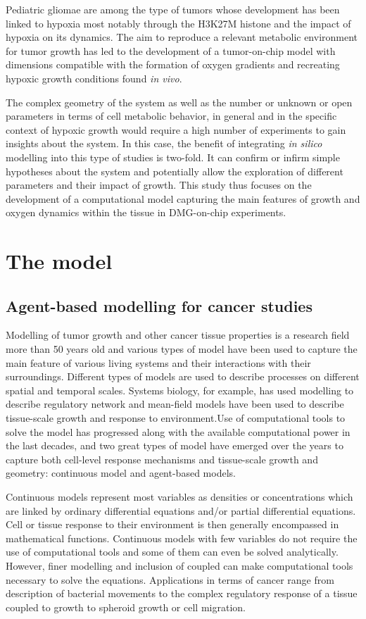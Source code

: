 \documentclass[11pt,a4paper]{article}
\begin{document}
Pediatric gliomae are among the type of tumors whose development has been linked to hypoxia most notably through the H3K27M histone and the impact of hypoxia on its dynamics.\cite{Rakotomalala2021} The aim to reproduce a relevant metabolic environment for tumor growth has led to the development of a tumor-on-chip model with dimensions compatible with the formation of oxygen gradients and recreating hypoxic growth conditions found \textit{in vivo}.

The complex geometry of the system as well as the number or unknown or open parameters in terms of cell metabolic behavior, in general and in the specific context of hypoxic growth would require a high number of experiments to gain insights about the system. In this case, the benefit of integrating \textit{in silico} modelling into this type of studies is two-fold. It can confirm or infirm simple hypotheses about the system and potentially allow the exploration of different parameters and their impact of growth. This study thus focuses on the development of a computational model capturing the main features of growth and oxygen dynamics within the tissue in DMG-on-chip experiments.

\section{The model}
\subsection{Agent-based modelling for cancer studies}
Modelling of tumor growth  and other cancer tissue properties is a research field more than 50 years old and various types of model have been used to capture the main feature of various living systems and their interactions with their surroundings. Different types of models are used to describe processes on different spatial and temporal scales. Systems biology, for example, has used modelling to describe regulatory network and mean-field models have been used to describe tissue-scale growth and response to environment.Use of computational tools to solve the model has progressed along with the available computational power in the last decades, and two great types of model have emerged over the years to capture both cell-level response mechanisms and tissue-scale growth and geometry: continuous model and agent-based models. 

Continuous models represent most variables as densities or concentrations which are linked by ordinary differential equations and/or partial differential equations. Cell or tissue response to their environment is then generally encompassed in mathematical functions. Continuous models with few variables do not require the use of computational tools and some of them can even be solved analytically. However, finer modelling and inclusion of coupled can make computational tools necessary to solve the equations. Applications in terms of cancer range from description of bacterial movements to the complex regulatory response of a tissue coupled to growth to spheroid growth or cell migration.\cite{Casciari1992}\cite{Villa2021}\cite{Katsaounis2023}
\end{document}
